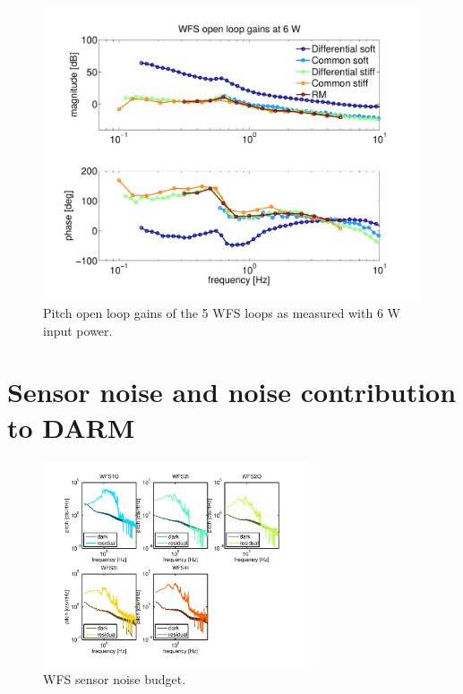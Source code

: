 \begin{figure}
\begin{centering}
\includegraphics[width=0.8\columnwidth]{figures/olgs6W.pdf}
\caption{Pitch open loop gains of the 5 WFS loops as measured with 6 W
  input power.}
\label{fig:olgs6W}
\end{centering}
\end{figure}

\section{Sensor noise and noise contribution to DARM}


\begin{figure}
\begin{centering}
\includegraphics[width=0.7\textwidth]{figures/ASCsensorsignals.pdf}
\caption{WFS sensor noise budget.}
\label{fig:}
\end{centering}
\end{figure}


